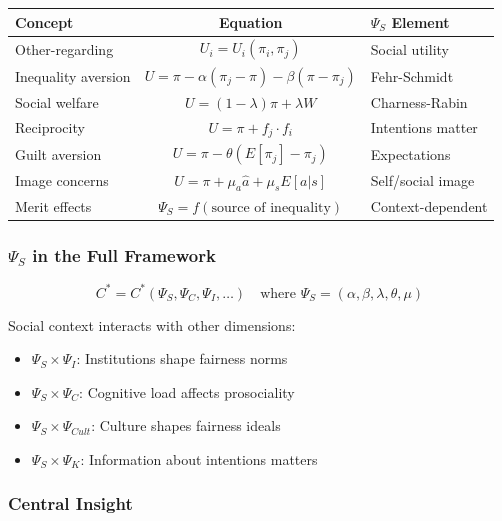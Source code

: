 \begin{center}
\renewcommand{\arraystretch}{1.5}
\begin{tabular}{|l|c|l|}
\hline
\textbf{Concept} & \textbf{Equation} & \textbf{$\Psi_S$ Element} \\
\hline
Other-regarding & $U_i = U_i(\pi_i, \pi_j)$ & Social utility \\
\hline
Inequality aversion & $U = \pi - \alpha(\pi_j-\pi) - \beta(\pi-\pi_j)$ & Fehr-Schmidt \\
\hline
Social welfare & $U = (1-\lambda)\pi + \lambda W$ & Charness-Rabin \\
\hline
Reciprocity & $U = \pi + f_j \cdot f_i$ & Intentions matter \\
\hline
Guilt aversion & $U = \pi - \theta(E[\pi_j] - \pi_j)$ & Expectations \\
\hline
Image concerns & $U = \pi + \mu_a \hat{a} + \mu_s E[a|s]$ & Self/social image \\
\hline
Merit effects & $\Psi_S = f(\text{source of inequality})$ & Context-dependent \\
\hline
\end{tabular}
\end{center}

\subsubsection{$\Psi_S$ in the Full Framework}

\begin{equation}
\boxed{
C^* = C^*(\Psi_S, \Psi_C, \Psi_I, \ldots) \quad \text{where } \Psi_S = (\alpha, \beta, \lambda, \theta, \mu)
}
\end{equation}

Social context interacts with other dimensions:
\begin{itemize}
    \item $\Psi_S \times \Psi_I$: Institutions shape fairness norms
    \item $\Psi_S \times \Psi_C$: Cognitive load affects prosociality
    \item $\Psi_S \times \Psi_{Cult}$: Culture shapes fairness ideals
    \item $\Psi_S \times \Psi_K$: Information about intentions matters
\end{itemize}

\subsubsection{Central Insight}

